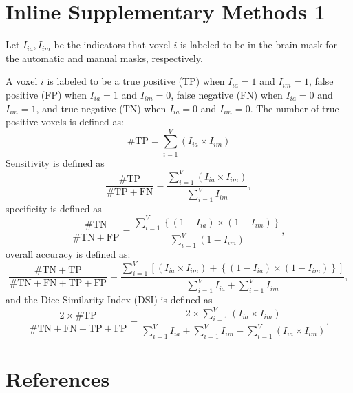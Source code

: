 \documentclass{elsarticle}\usepackage[]{graphicx}\usepackage[]{color}
\begin{document}
\newpage
\section*{Inline Supplementary Methods 1}
Let $I_{ia}, I_{im}$ be the indicators that voxel $i$ is labeled to be in the brain mask for the automatic and manual masks, respectively.  

A voxel $i$ is labeled to be a true positive (TP) when $I_{ia} = 1$ and $I_{im} = 1$, false positive (FP) when $I_{ia} = 1$ and $I_{im} = 0$, false negative (FN) when $I_{ia} = 0$ and $I_{im} = 1$, and true negative (TN) when $I_{ia} = 0$ and $I_{im} = 0$.  The number of true positive voxels is defined as: 
$$
\# \text{TP} = \sum_{i=1}^{V} \left( I_{ia} \times I_{im}\right)
$$
Sensitivity is defined as
$$
\frac{\# \text{TP} }{\# \text{TP} + \text{FN}} = \frac{ \sum_{i=1}^{V} \left( I_{ia} \times I_{im}\right) }{ \sum_{i=1}^{V} I_{im}},
$$
specificity is defined as
$$
\frac{\# \text{TN} }{\# \text{TN} + \text{FP}} = \frac{ \sum_{i=1}^{V} \left\{ (1-I_{ia}) \times (1- I_{im} ) \right\} }{ \sum_{i=1}^{V} (1 - I_{im} )},
$$
overall accuracy is defined as:
$$
\frac{\# \text{TN} + \text{TP} }{\# \text{TN} + \text{FN} + \text{TP} + \text{FP}} = \frac{ \sum_{i=1}^{V} \left[ (I_{ia} \times I_{im}) + \left\{ (1-I_{ia}) \times (1- I_{im} ) \right\} \right] }{\sum_{i=1}^{V} I_{ia}  + \sum_{i=1}^{V} I_{im}},
$$
and the Dice Similarity Index (DSI) is defined as
$$
\frac{2 \times \#\text{TP} }{ \# \text{TN} + \text{FN} + \text{TP} + \text{FP}} = \frac{ 2 \times \sum_{i=1}^{V} \left( I_{ia} \times I_{im}\right) }{\sum_{i=1}^{V} I_{ia}  + \sum_{i=1}^{V} I_{im} - \sum_{i=1}^{V} \left( I_{ia} \times I_{im}\right)}.
$$






\newpage
\section*{References}


\end{document}
